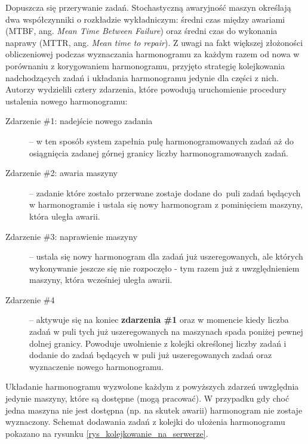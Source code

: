 \documentclass[archivemode]{mgr}
\begin{document}
Dopuszcza się przerywanie zadań. Stochastyczną awaryjność maszyn określają dwa współczynniki o rozkładzie wykładniczym: średni czas między awariami (MTBF, ang. \emph{Mean Time Between Failure}) oraz średni czas do wykonania naprawy (MTTR, ang. \emph{Mean time to repair}). Z uwagi na fakt większej złożoności obliczeniowej podczas wyznaczania harmonogramu za każdym razem od nowa w porównaniu z korygowaniem harmonogramu, przyjęto strategię kolejkowania nadchodzących zadań i układania harmonogramu jedynie dla części z nich. Autorzy wydzielili cztery zdarzenia, które powodują uruchomienie procedury ustalenia nowego harmonogramu:
\begin{description}
    \item[Zdarzenie \#1: nadejście nowego zadania] -- w ten sposób system zapełnia pulę harmonogramowanych zadań aż do osiągnięcia zadanej górnej granicy liczby harmonogramowanych zadań.
    \item[Zdarzenie \#2: awaria maszyny] -- zadanie które zostało przerwane zostaje dodane do~puli zadań będących w harmonogramie i ustala się nowy harmonogram z pominięciem maszyny, która uległa awarii.
    \item[Zdarzenie \#3: naprawienie maszyny] -- ustala się nowy harmonogram dla zadań już uszeregowanych, ale których wykonywanie jeszcze się nie rozpoczęło - tym razem już z uwzględnieniem maszyny, która wcześniej uległa awarii.
    \item[Zdarzenie \#4] -- aktywuje się na koniec \textbf{zdarzenia \#1} oraz w momencie kiedy liczba zadań w puli tych już uszeregowanych na maszynach spada poniżej pewnej dolnej granicy. Powoduje uwolnienie z kolejki określonej liczby zadań i dodanie do zadań będących w puli już uszeregowanych zadań oraz wyznaczenie nowego harmonogramu.
\end{description}
Układanie harmonogramu wyzwolone każdym z powyższych zdarzeń uwzględnia jedynie maszyny, które są dostępne (mogą pracować). W przypadku gdy choć jedna maszyna nie jest dostępna (np. na skutek awarii) harmonogram nie zostaje wyznaczony. Schemat dodawania zadań z kolejki do ułożenia harmonogramu pokazano na rysunku \ref{rys_kolejkowanie_na_serwerze}.
\end{document}
